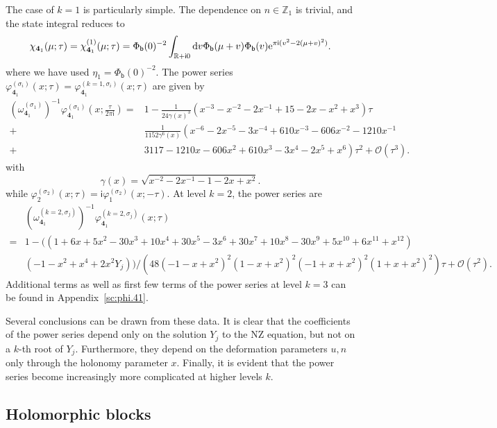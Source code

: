 \documentclass[a4paper,11pt]{article}	%
\def\md{\mathbf}
\def\ms{\mathsf}
\def\IR{\mathbb{R}}
\def\IZ{\mathbb{Z}}
\def\cO{\mathcal{O}}
\newcommand{\re}{{\rm e}}
\newcommand{\ri}{{\mathsf{i}}}
\newcommand{\rd}{{\rm d}}
\newcommand{\nn}{\nonumber \\}
\newcommand{\bb}{\ms{b}}
\newcommand{\s}{\sigma}
\newcommand{\knot}[1]{\md{#1}}
\def\jjj#1{$\spadesuit\spadesuit$ \emph{\textcolor{red}{#1}}
  $\spadesuit\spadesuit$}
\begin{document}
The case of $k=1$ is particularly simple. The dependence on
$n\in\IZ_1$ is trivial, and the state integral reduces to
\cite{Garoufalidis:2020xec}
\begin{align}
  \chi_{\knot{4}_1}(\mu;\tau) =
  \chi_{\knot{4}_1}^{(1)}(\mu;\tau) =
  \Phi_\bb(0)^{-2}\int_{\IR+\ri 0} \rd v \Phi_\bb(\mu+v)\Phi_\bb(v)
  \re^{\pi\ri(v^2-2(\mu+v)^2)}.
\end{align}
where we have used $\eta_1 = \Phi_\bb(0)^{-2}$.  The power series
$\varphi_{\knot{4}_1}^{(\s_i)}(x;\tau) =
\varphi_{\knot{4}_1}^{(k=1,\s_i)}(x;\tau)$ are given by
\cite{Garoufalidis:2020xec}
\begin{align}
  (\omega_{\knot{4}_1}^{(\s_1)})^{-1}
  \varphi_{\knot{4}_1}^{(\s_1)}(x;\frac{\tau}{2\pi\ri}) =
  &1-
    \frac{1}{24\gamma(x)^3}\left(
    x^{-3}-x^{-2}-2x^{-1}+15-2x-x^2+x^3\right)\tau\nn  +
  &\frac{1}{1152\gamma^6(x)}\left(
    x^{-6}-2x^{-5}-3x^{-4}+610x^{-3}-606x^{-2}-1210x^{-1}\right.\nn+
  &\left.3117 -1210x-606x^2+610x^3-3x^4-2x^5+x^6
    \right)\tau^2+\cO(\tau^3).
    \label{eq:vphi1.k1}
\end{align}
with
\begin{equation}
  \gamma(x) = \sqrt{x^{-2}-2x^{-1}-1-2x+x^2}.
\end{equation}
while $\varphi_2^{(\s_2)}(x;\tau) = \ri \varphi_1^{(\s_2)}(x;-\tau)$.
At level $k=2$, the power series are
\begin{align}
  &(\omega_{\knot{4}_1}^{(k=2,\s_j)})^{-1}\varphi_{\knot{4}_1}^{(k=2,\s_j)}(x;\tau)\nn
    =
  &1 -((1 + 6 x + 5 x^2 - 30 x^3 + 10 x^4 + 30 x^5 - 3 x^6 + 30 x^7 + 
    10 x^8 - 30 x^9 + 5 x^{10} + 6 x^{11} + x^{12}) \nn
  &(-1 - x^2 + x^4 + 2 x^2 Y_j))/(48 (-1 - x + x^2)^2 (1 - x + x^2)^2 (-1 + x + 
    x^2)^2 (1 + x + x^2)^2)\tau + \cO(\tau^2).
    \label{eq:phi41k2}
\end{align}
%
Additional terms as well as first few terms of the power series at
level $k=3$ can be found in Appendix~\ref{sc:phi.41}.

Several conclusions can be drawn from these data.  It is clear that
the coefficients of the power series depend only on the solution $Y_j$
to the NZ equation, but not on a $k$-th root of $Y_j$.  Furthermore,
they depend on the deformation parameters $u,n$ only through the
holonomy parameter $x$.  Finally, it is evident that the power series
become increasingly more complicated at higher levels $k$.


\subsection{Holomorphic blocks}
\label{sc:41.blocks}
\end{document}
